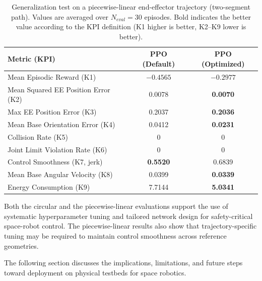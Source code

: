 \documentclass{ieeeaccess}
\begin{document}
\begin{table}[!b]
\centering
\caption{Generalization test on a piecewise-linear end-effector trajectory (two-segment path). Values are 
averaged over $N_{eval}=30$ episodes. Bold indicates the better value according to the KPI definition
(K1 higher is better, K2--K9 lower is better).}
\label{tab:ppo_linear_kpi}
\renewcommand{\arraystretch}{1.2}
\setlength{\tabcolsep}{3pt}
\begin{tabular}{lcc}
\toprule
\textbf{Metric (KPI)} & \textbf{PPO (Default)} & \textbf{PPO (Optimized)} \\
\midrule
Mean Episodic Reward (K1)            & $-0.4565$ & $\mathbf{-0.2977}$ \\
Mean Squared EE Position Error (K2)  & 0.0078 & \textbf{0.0070} \\
Max EE Position Error (K3)           & 0.2037 & \textbf{0.2036} \\
Mean Base Orientation Error (K4)     & 0.0412 & \textbf{0.0231} \\
Collision Rate (K5)                 & 0 & 0 \\
Joint Limit Violation Rate (K6)     & 0 & 0 \\
Control Smoothness (K7, jerk)       & \textbf{0.5520} & 0.6839 \\
Mean Base Angular Velocity (K8)      & 0.0399 & \textbf{0.0339} \\
Energy Consumption (K9)              & 7.7144 & \textbf{5.0341} \\
\bottomrule
\end{tabular}
\end{table}


Both the circular and the piecewise-linear evaluations support the use of systematic hyperparameter tuning
and tailored network design for safety-critical space-robot control. The piecewise-linear results also show that
trajectory-specific tuning may be required to maintain control smoothness across reference geometries.

The following section discusses the implications, limitations, and future steps toward deployment on physical
testbeds for space robotics.
\end{document}
